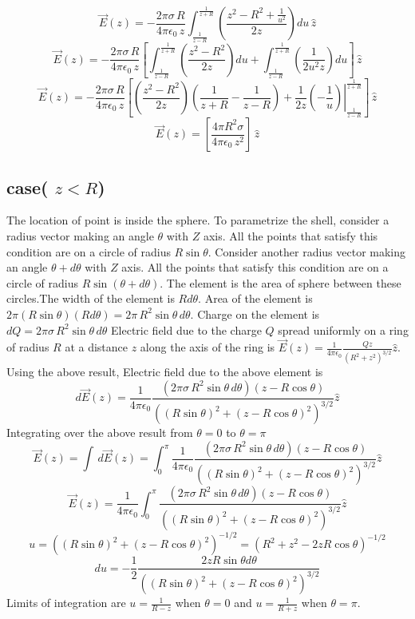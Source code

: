 \documentclass[12pt]{article}
\begin{document}
$$\vec{E}(z)=-\frac{2\pi\sigma\,R}{4\pi\epsilon_0\,z}\int_{\frac{1}{z-R}}^{\frac{1}{z+R}}\left(\frac{z^2-R^2+\frac{1}{u^2}}{2z} \right )du\,\hat{z}$$
$$\vec{E}(z)=-\frac{2\pi\sigma\,R}{4\pi\epsilon_0\,z}\left[\int_{\frac{1}{z-R}}^{\frac{1}{z+R}}\left(\frac{z^2-R^2}{2z} \right )du+\int_{\frac{1}{z-R}}^{\frac{1}{z+R}}\left(\frac{1}{2u^2z} \right )du\right ]\,\hat{z}
$$
$$\vec{E}(z)=-\frac{2\pi\sigma\,R}{4\pi\epsilon_0\,z}\left[\left(\frac{z^2-R^2}{2z} \right )\left(\frac{1}{z+R}-\frac{1}{z-R} \right )+\frac{1}{2z}\left.\left(-\frac{1}{u} \right )\right|_{\frac{1}{z-R}}^{\frac{1}{z+R}}\right ]\,\hat{z}$$
$$\vec{E}(z)=\left[\frac{4\pi{R^2}\sigma}{4\pi\epsilon_0\,z^2} \right ]\,\hat{z}$$
\subsection*{case( $z<R$)}
The location of point is inside the sphere.
To parametrize the shell, consider a radius vector making an angle $\theta$ with $Z$ axis. All the points that satisfy this condition are on a circle of radius $R\sin{\theta}$. Consider another radius vector making an angle $\theta+d\theta$ with $Z$ axis. All the points that satisfy this condition are on a circle of radius $R\sin{(\theta+d\theta)} $. The element is the area of sphere between these circles.The width of the element is $Rd\theta$. Area of the element is $2\pi(R\sin{\theta})(Rd\theta)=2\pi\,R^2\sin{\theta}\,d\theta$. Charge on the element is $dQ=2\pi\sigma\,R^2\sin{\theta}\,d\theta$
Electric field due to the charge $Q$ spread uniformly on a ring of radius $R$ at a distance $z$ along the axis of the ring is $\vec{E}(z)=\frac{1}{4\pi\epsilon_0}\frac{Qz}{(R^2+z^2)^{3/2}}\hat{z}$.
Using the above result,
Electric field due to the above element is $$d\vec{E}(z)=\frac{1}{4\pi\epsilon_0}\frac{(2\pi\sigma\,R^2\sin{\theta}\,d\theta)(z-R\cos{\theta})}{((R\sin{\theta})^2+(z-R\cos{\theta})^2)^{3/2}}\hat{z}$$
Integrating over the above result from $\theta=0$ to $\theta=\pi$
$$\vec{E}(z)=\int\,d\vec{E}(z)=\int_{0}^{\pi}\frac{1}{4\pi\epsilon_0}\frac{(2\pi\sigma\,R^2\sin{\theta}\,d\theta)(z-R\cos{\theta})}{((R\sin{\theta})^2+(z-R\cos{\theta})^2)^{3/2}}\hat{z}$$
$$\vec{E}(z)=\frac{1}{4\pi\epsilon_0}\int_{0}^{\pi}\frac{(2\pi\sigma\,R^2\sin{\theta}\,d\theta)(z-R\cos{\theta})}{((R\sin{\theta})^2+(z-R\cos{\theta})^2)^{3/2}}\hat{z}$$
$$u=((R\sin{\theta})^2+(z-R\cos{\theta})^2)^{-1/2}=(R^2+z^2-2zR\cos{\theta})^{-1/2}$$
$$du=-\frac{1}{2}\frac{2zR\sin{\theta}d{\theta}}{((R\sin{\theta})^2+(z-R\cos{\theta})^2)^{3/2}}$$
Limits of integration are $u=\frac{1}{R-z}$ when $\theta=0$ and $u=\frac{1}{R+z}$ when $\theta=\pi$.
\end{document}
